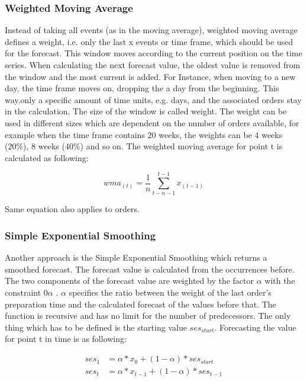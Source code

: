 \subsubsection{Weighted Moving Average}\label{subsubsection:Weighted Moving Average}
Instead of taking all events (as in the moving average), weighted moving average defines a weight, i.e. only the last x events or time frame, which should be used for the forecast. This window moves according to the current position on the time series. When calculating the next forecast value, the oldest value is removed from the window and the most current is added. For Instance, when moving to a new day, the time frame moves on, dropping the a day from the beginning. This way,only a specific amount of time units, e.g. days, and the associated orders stay in the calculation. The size of the window is called weight. The weight can be used in different sizes which are dependent on the number of orders available, for example when the time frame contains 20 weeks, the weights can be 4 weeks (20\%), 8 weeks (40\%) and so on.\newline
The weighted moving average for point t is calculated as following:

\begin{center}
\begin{equation}
wma_{(t)}= \frac{1}{n}\sum^{t-1}_{t-n-1} x_{(t-1)}
\end{equation}
\end{center}
Same equation also applies to orders.

\subsubsection{Simple Exponential Smoothing}\label{subsubsection:Simple Exponential Smoothing}
Another approach is the Simple Exponential Smoothing which returns a smoothed forecast. The forecast value is calculated from the occurrences before. The two components of the forecast value are weighted by the factor $\alpha$ with the constraint 0\le $\alpha$ . $\alpha$ specifies the ratio between the weight of the last order's preparation time and the calculated forecast of the values before that. The function is recursive and has no limit for the number of predecessors. The only thing which has to be defined is the starting value $ses_{start}$.\newline
Forecasting the value for point t in time is as following:

\begin{equation}
  \begin{align}
  	ses_1 &= \alpha * x_{0} + (1 - \alpha) * ses_{start} \\
  	ses_t&=\alpha*x_{t-1}+(1-\alpha)*ses_{t-1}
  \end{align}
\end{equation}


